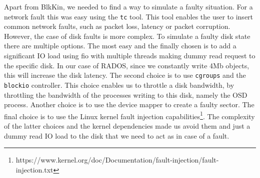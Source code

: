 Apart from BlkKin, we needed to find a way to simulate a faulty situation. For a
network fault this was easy using the \texttt{tc} tool. This tool enables the
user to insert common network faults, such as packet loss, latency or packet
corruption.  However, the case of disk faults is more complex. To simulate a
faulty disk state there are multiple options. The most easy and the finally
chosen is to add a significant IO load using fio with multiple threads making
dummy read request to the specific disk. In our case of RADOS, since we
constantly write 4Mb objects, this will increase the disk latency. The second
choice is to use \texttt{cgroups} and the \texttt{blockio} controller. This
choice enables us to throttle a disk bandwidth, by throttling the bandwidth of
the processes writing to this disk, namely the OSD process. Another choice is to
use the device mapper to create a faulty sector. The final choice is to use the
Linux kernel fault injection
capabilities\footnote{https://www.kernel.org/doc/Documentation/fault-injection/fault-injection.txt}.
The complexity of the latter choices and the kernel dependencies made us avoid
them and just a dummy read IO load to the disk that we need to act as in case of
a fault.




